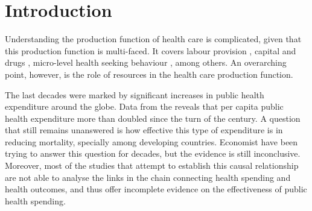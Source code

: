 \section{Introduction}\label{sec:intro}
\setcounter{page}{1}




Understanding the production function of health care is complicated, given that this production function is multi-faced. It covers labour provision \citep{Custeretal1990}, capital and drugs \citep{Austeretal1969}, micro-level health seeking behaviour \citep{LlerasMuney2005}, among others. An overarching point, however, is the role of resources in the health care production function.

The last decades were marked by significant increases in public health expenditure around the globe. Data from the \cite{wb} reveals that per capita public health expenditure more than doubled since the turn of the century. A question that still remains unanswered is how effective this type of expenditure is in reducing mortality, specially among developing countries. Economist have been trying to answer this question for decades, but the evidence is still inconclusive. Moreover, most of the studies that attempt to establish this causal relationship are not able to analyse the links in the chain connecting health spending and health outcomes, and thus offer incomplete evidence on the effectiveness of public health spending.


